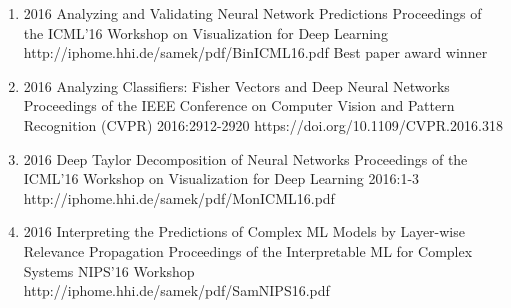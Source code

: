 \documentclass[10pt,a4paper]{article} %
\begin{document}
{\begin{enumerate}
        \item[] 
                                {2016}
                                {Analyzing and Validating Neural Network Predictions}
                                {Proceedings of the ICML'16 Workshop on Visualization for Deep Learning}
                                {}
                                {http://iphome.hhi.de/samek/pdf/BinICML16.pdf}
                                {Best paper award winner}

        \item[] 
                                {2016}
                                {Analyzing Classifiers: Fisher Vectors and Deep Neural Networks}
                                {Proceedings of the IEEE Conference on Computer Vision and Pattern Recognition (CVPR)}
                                {2016:2912-2920}
                                {https://doi.org/10.1109/CVPR.2016.318}

        \item[] 
                                {2016}
                                {Deep Taylor Decomposition of Neural Networks}
                                {Proceedings of the ICML'16 Workshop on Visualization for Deep Learning}
                                {2016:1-3}
                                {http://iphome.hhi.de/samek/pdf/MonICML16.pdf}

        \item[] 
                                {2016}
                                {Interpreting the Predictions of Complex ML Models by Layer-wise Relevance Propagation}
                                {Proceedings of the Interpretable ML for Complex Systems NIPS'16 Workshop}
                                {}
                                {http://iphome.hhi.de/samek/pdf/SamNIPS16.pdf}

    \end{enumerate}
}
\end{document}

